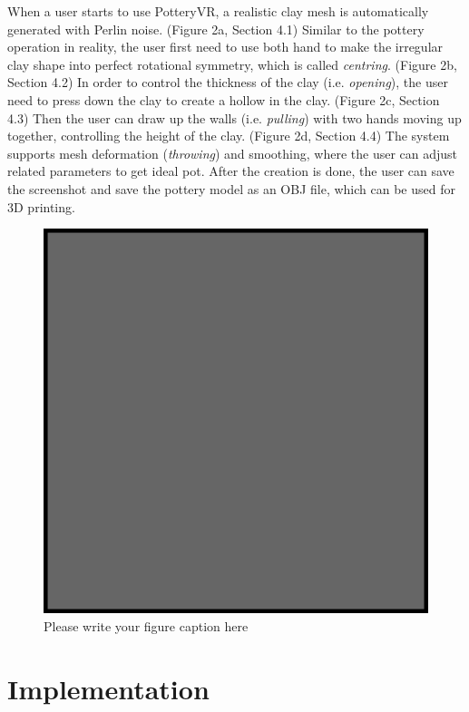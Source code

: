 When a user starts to use PotteryVR, a realistic clay mesh is automatically generated with Perlin noise. (Figure 2a, Section 4.1)
Similar to the pottery operation in reality, the user first need to use both hand to make the irregular clay shape into perfect rotational symmetry, which is called \textit{centring}. (Figure 2b, Section 4.2)
In order to control the thickness of the clay (i.e. \textit{opening}), the user need to press down the clay to create a hollow in the clay. (Figure 2c, Section 4.3)
Then the user can draw up the walls (i.e. \textit{pulling}) with two hands moving up together, controlling the height of the clay. (Figure 2d, Section 4.4)
The system supports mesh deformation (\textit{throwing}) and smoothing, where the user can adjust related parameters to get ideal pot.
After the creation is done, the user can save the screenshot and save the pottery model as an OBJ file, which can be used for 3D printing.
\begin{figure}
  \includegraphics{example.eps}
\caption{Please write your figure caption here}
\label{fig:1}       %
\end{figure}


\section{Implementation}
\label{sec:4}

